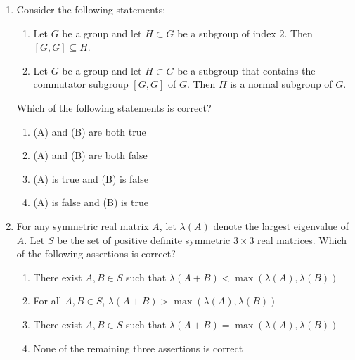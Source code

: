 \documentclass[11pt, a4paper]{article}
\begin{document}
\begin{enumerate}
  \item Consider the following statements:
  \begin{enumerate}[label=(\Alph*)]
    \item Let $G$ be a group and let $H \subset G$ be a subgroup of index $2$. Then $[G, G] \subseteq H$.
    \item Let $G$ be a group and let $H \subset G$ be a subgroup that contains the commutator subgroup $[G, G]$ of $G$. Then $H$ is a normal subgroup of $G$.
  \end{enumerate}
  Which of the following statements is correct?
  \begin{enumerate}[label=(\alph*)]
    \item (A) and (B) are both true
    \item (A) and (B) are both false
    \item (A) is true and (B) is false
    \item (A) is false and (B) is true
  \end{enumerate}

  \item For any symmetric real matrix $A$, let $\lambda(A)$ denote the largest eigenvalue of $A$. Let $S$ be the set of positive definite symmetric $3 \times 3$ real matrices. Which of the following assertions is correct?
  \begin{enumerate}[label=(\alph*)]
    \item There exist $A, B \in S$ such that $\lambda(A + B) < \max(\lambda(A), \lambda(B))$
    \item For all $A, B \in S$, $\lambda(A + B) > \max(\lambda(A), \lambda(B))$
    \item There exist $A, B \in S$ such that $\lambda(A + B) = \max(\lambda(A), \lambda(B))$
    \item None of the remaining three assertions is correct
  \end{enumerate}


\end{enumerate}
\end{document}
